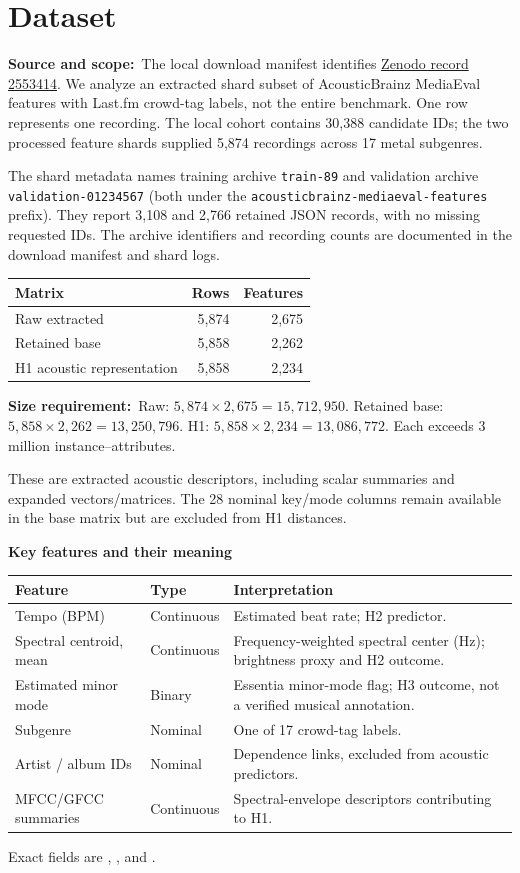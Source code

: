 \documentclass[10pt,a4paper,twocolumn]{article}
\newcommand{\field}[2]{\textbf{#1}~#2\par}
\newcommand{\minihead}[1]{\par\needspace{6\baselineskip}\smallskip\textbf{#1}\par}
\begin{document}
\section{Dataset}
\field{Source and scope:}{The local download manifest identifies \href{https://zenodo.org/records/2553414}{Zenodo record 2553414}. We analyze an extracted shard subset of AcousticBrainz MediaEval features with Last.fm crowd-tag labels, not the entire benchmark. One row represents one recording. The local cohort contains 30,388 candidate IDs; the two processed feature shards supplied 5,874 recordings across 17 metal subgenres.}
The shard metadata names training archive \texttt{train-89} and validation archive \texttt{validation-01234567} (both under the \texttt{acousticbrainz-mediaeval-features} prefix). They report 3,108 and 2,766 retained JSON records, with no missing requested IDs. The archive identifiers and recording counts are documented in the download manifest and shard logs.

\begin{tabularx}{\linewidth}{@{}Y r r@{}}\toprule
Matrix & Rows & Features\\\midrule
Raw extracted & 5,874 & 2,675\\
Retained base & 5,858 & 2,262\\
H1 acoustic representation & 5,858 & 2,234\\\bottomrule
\end{tabularx}
\field{Size requirement:}{Raw: $5{,}874\times2{,}675=15{,}712{,}950$. Retained base: $5{,}858\times2{,}262=13{,}250{,}796$. H1: $5{,}858\times2{,}234=13{,}086{,}772$. Each exceeds 3 million instance--attributes.}
These are extracted acoustic descriptors, including scalar summaries and expanded vectors/matrices. The 28 nominal key/mode columns remain available in the base matrix but are excluded from H1 distances.

\minihead{Key features and their meaning}
{\small\begin{tabularx}{\linewidth}{@{}L{2.25cm} L{1.65cm} Y@{}}\toprule
Feature & Type & Interpretation\\\midrule
Tempo (BPM) & Continuous & Estimated beat rate; H2 predictor.\\
Spectral centroid, mean & Continuous & Frequency-weighted spectral center (Hz); brightness proxy and H2 outcome.\\
Estimated minor mode & Binary & Essentia minor-mode flag; H3 outcome, not a verified musical annotation.\\
Subgenre & Nominal & One of 17 crowd-tag labels.\\
Artist / album IDs & Nominal & Dependence links, excluded from acoustic predictors.\\
MFCC/GFCC summaries & Continuous & Spectral-envelope descriptors contributing to H1.\\\bottomrule
\end{tabularx}}
Exact fields are , , and .
\end{document}
